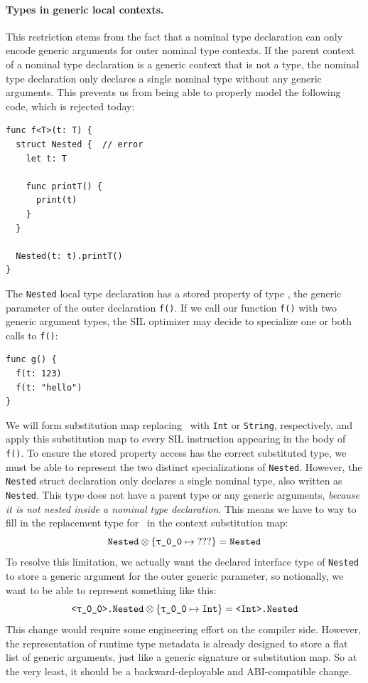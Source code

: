 \documentclass[../generics]{subfiles}
\begin{document}
\paragraph{Types in generic local contexts.} This restriction stems from the fact that a nominal type declaration can only encode generic arguments for outer nominal type contexts. If the parent context of a nominal type declaration is a generic context that is not a type, the nominal type declaration only declares a single nominal type without any generic arguments. This prevents us from being able to properly model the following code, which is rejected today:
\begin{Verbatim}
func f<T>(t: T) {
  struct Nested {  // error
    let t: T

    func printT() {
      print(t)
    }
  }

  Nested(t: t).printT()
}
\end{Verbatim}
The \texttt{Nested} local type declaration has a stored property of type \rT, the generic parameter of the outer declaration \texttt{f()}. If we call our function \texttt{f()} with two generic argument types, the SIL optimizer may decide to specialize one or both calls to \texttt{f()}:
\begin{Verbatim}
func g() {
  f(t: 123)
  f(t: "hello")
}
\end{Verbatim}
We will form substitution map replacing \rT\ with \texttt{Int} or \texttt{String}, respectively, and apply this substitution map to every SIL instruction appearing in the body of \texttt{f()}. To ensure the stored property access has the correct substituted type, we must be able to represent the two distinct specializations of \texttt{Nested}. However, the \texttt{Nested} struct declaration only declares a single nominal type, also written as \texttt{Nested}. This type does not have a parent type or any generic arguments, \textsl{because it is not nested inside a nominal type declaration}. This means we have to way to fill in the replacement type for \rT\ in the context substitution map:
\[
\texttt{Nested} \otimes \SubstMap{\rT\mapsto\text{???}} = \texttt{Nested}
\]
To resolve this limitation, we actually want the declared interface type of \texttt{Nested} to store a generic argument for the outer generic parameter, so notionally, we want to be able to represent something like this:
\[
\texttt{<\rT>.Nested} \otimes \SubstMap{\SubstType{\rT}{Int}} = \texttt{<Int>.Nested}
\]
This change would require some engineering effort on the compiler side. However, the representation of runtime type metadata is already designed to store a flat list of generic arguments, just like a generic signature or substitution map. So at the very least, it should be a backward-deployable and ABI-compatible change.
\end{document}
